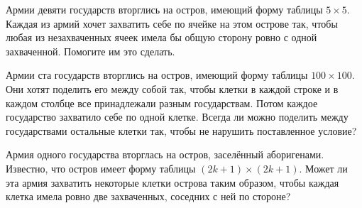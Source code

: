 ﻿
\begin{itemize}

\itA Армии девяти государств вторглись на остров, имеющий форму таблицы $5 \times 5$. Каждая из армий хочет захватить себе по ячейке на этом острове так, чтобы любая из незахваченных ячеек имела бы общую сторону ровно с одной захваченной. Помогите им это сделать.

\itB Армии ста государств вторглись на остров, имеющий форму таблицы $100 \times 100$. Они хотят поделить его между собой так, чтобы клетки в каждой строке и в каждом столбце все принадлежали разным государствам. Потом каждое государство захватило себе по одной клетке. Всегда ли можно поделить между государствами остальные клетки так, чтобы не нарушить поставленное условие?

\itC Армия одного государства вторглась на остров, заселённый аборигенами. Известно, что остров имеет форму таблицы $(2k+1) \times (2k+1)$. Может ли эта армия захватить некоторые клетки острова таким образом, чтобы каждая клетка имела ровно две захваченных, соседних с ней по стороне?
\end{itemize}